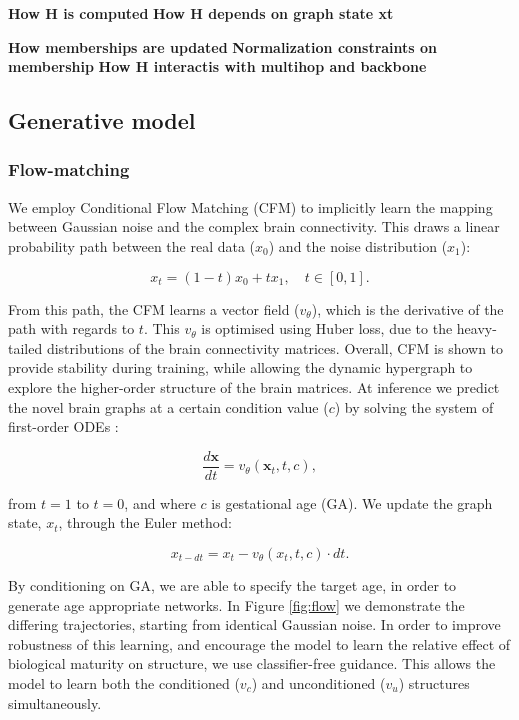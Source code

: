 \documentclass[sigconf, review]{acmart}
\begin{document}
\textbf{How H is computed 
}
\textbf{How H depends on graph state xt }

\textbf{How memberships are updated 
}
\textbf{Normalization constraints on membership  
}
\textbf{How H interactis with multihop and backbone 
}

\subsection{Generative model}
\subsubsection{Flow-matching}
We employ Conditional Flow Matching (CFM) \cite{lipman2023flowmatchinggenerativemodeling} to implicitly learn the mapping between Gaussian noise and the complex brain connectivity. This draws a linear probability path between the real data ($x_0$) and the noise distribution ($x_1$):

    \begin{equation}
        x_t = (1 - t)x_0 + t x_1, \quad t \in [0, 1].
    \end{equation}

From this path, the CFM learns a vector field ($v_\theta$), which is the derivative of the path with regards to $t$. This $v_\theta$ is optimised using Huber loss, due to the heavy-tailed distributions of the brain connectivity matrices. Overall, CFM is shown to provide stability during training, while allowing the dynamic hypergraph to explore the higher-order structure of the brain matrices.
At inference we predict the novel brain graphs at a certain condition value ($c$) by solving the system of first-order ODEs :

    \begin{equation}
        \frac{d\mathbf{x}}{dt} = v_\theta(\mathbf{x}_t, t, c) ,
    \end{equation}

    from $t=1$ to $t=0$, and where $c$ is gestational age (GA). We update the graph state, $x_t$, through the Euler method:

    \begin{equation}
        x_{t-dt}= x_t - v_\theta (x_t,t,c) \cdot dt .
    \end{equation}

By conditioning on GA, we are able to specify the target age, in order to generate age appropriate networks. In Figure \ref{fig:flow} we demonstrate the differing trajectories, starting from identical Gaussian noise.
In order to improve robustness of this learning, and encourage the model to learn the relative effect of biological maturity on structure, we use classifier-free guidance. This allows the model to learn both the conditioned ($v_c$) and unconditioned ($v_u$) structures simultaneously. 
   
\end{document}
